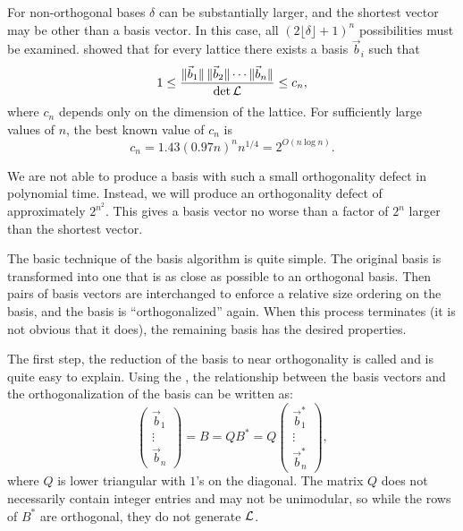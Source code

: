 For non-orthogonal bases $\delta$ can be substantially larger, and the
shortest vector may be other than a basis vector.  In this case, all
$(2\lfloor \delta\rfloor + 1)^n$ possibilities must be examined.
{\Hermite} \cite{Hermite:Lattices} showed that for every lattice there
exists a basis $\vec{b}_i$ such that
\[
1 \le \frac{\|\vec{b}_1\| \, \|\vec{b}_2\| \cdots \|\vec{b}_n\|}{\det {\cal L}}
   \le c_n,
\]
where $c_n$ depends only on the dimension of the lattice.  For
sufficiently large values of $n$, the best known value of $c_n$ is
\[
c_n = 1.43 (0.97 n)^n n^{1/4} = 2^{O(n\log n)}.
\]

We are not able to produce a basis with such a small orthogonality
defect in polynomial time.  Instead, we will produce an orthogonality
defect of approximately $2^{n^2}$.  This gives a basis vector no
worse than a factor of $2^n$ larger than the shortest vector.

\medskip
The basic technique of the {\Lovasz} basis algorithm is quite simple.
The original basis is transformed into one that is as close as
possible to an orthogonal basis.  Then pairs of basis vectors are
interchanged to enforce a relative size ordering on the basis, and the
basis is ``orthogonalized'' again.  When this process terminates (it
is not obvious that it does), the remaining basis has the desired
properties.

The first step, the reduction of the basis to near orthogonality is
called  and is
quite easy to explain.  Using the , the
relationship between the basis vectors and the orthogonalization of
the basis can be written as:
\begin{equation} \label{Lat:WeakB:Eq}
\left(
 \begin{array}{c} \vec{b}_1 \\ \vdots \\ \vec{b}_n \end{array}
\right)
= B = Q B^{\ast} = 
Q \left(
 \begin{array}{c} \vec{b}^{\ast}_1 \\ \vdots \\ \vec{b}^{\ast}_n \end{array}
\right),
\end{equation}
where $Q$ is lower triangular with $1$'s on the diagonal.  The matrix
$Q$ does not necessarily contain integer entries and may not be
unimodular, so while the rows of $B^{\ast}$
are orthogonal, they do not generate ${\cal L}$.

